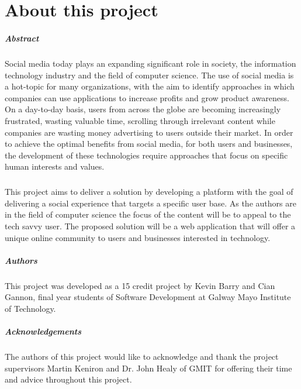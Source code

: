 
\chapter*{About this project}
\paragraph{Abstract}
Social media today plays an expanding significant role in society, the information technology industry and the field of computer science. The use of social media is a hot-topic for many organizations, with the aim to identify approaches in which companies can use applications to increase profits and grow product awareness. On a day-to-day basis, users from across the globe are becoming increasingly frustrated, wasting valuable time, scrolling through irrelevant content while companies are wasting money advertising to users outside their market.  In order to achieve the optimal benefits from social media, for both users and businesses, the development of these technologies require approaches that focus on specific human interests and values.

\paragraph{}
This project aims to deliver a solution by developing a platform with the goal of delivering a social experience that targets a specific user base. As the authors are in the field of computer science the focus of the content will be to appeal to the tech savvy user. The proposed solution will be a web application that will offer a unique online community to users and businesses interested in technology. 

\paragraph{Authors}
This project was developed as a 15 credit project by Kevin Barry and Cian Gannon, final year students of Software Development at Galway Mayo Institute of Technology.

\paragraph{Acknowledgements}
The authors of this project would like to acknowledge and thank the project supervisors Martin Keniron and Dr. John Healy of GMIT for offering their time and advice throughout this project.















